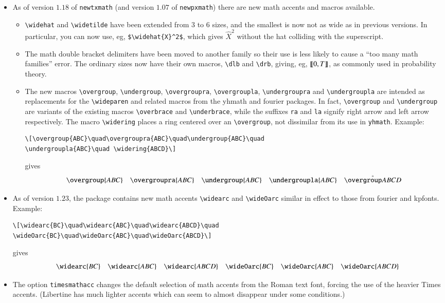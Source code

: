 \documentclass[\fsc]{article}
\theoremstyle{oldplain}
\theoremstyle{plain}
\begin{document}
\begin{itemize}
\item As of version $1.18$ of {\tt newtxmath} (and version $1.07$ of {\tt newpxmath}) there are new math accents and macros available.
\begin{itemize}
\item
\verb|\widehat| and \verb|\widetilde| have been extended from $3$ to $6$ sizes, and the smallest is now not as wide as in previous versions. In particular, you can now use, eg, \verb|$\widehat{X}^2$|, which gives $\widehat{X}^2$ without the hat colliding with the superscript.
\item The math double bracket delimiters have been moved to another family so their use is less likely to cause a ``too many math families'' error. The ordinary sizes now have their own macros, \verb|\dlb| and \verb|\drb|, giving, eg, $\llbracket 0,T\rrbracket$, as commonly used in probability theory.
\item The new macros \verb|\overgroup|, \verb|\undergroup|, \verb|\overgroupra|, \verb|\overgroupla|, \verb|\undergroupra| and \verb|\undergroupla| are intended as replacements for the \verb|\wideparen| and related macros from the \textsf{yhmath} and \textsf{fourier} packages. In fact, \verb|\overgroup| and \verb|\undergroup| are variants of the existing macros \verb|\overbrace| and \verb|\underbrace|, while the suffixes {\tt ra} and {\tt la} signify right arrow and left arrow respectively. The macro \verb|\widering| places a ring centered over an \verb|\overgroup|, not dissimilar from its use in {\tt yhmath}. Example:
\begin{verbatim}
\[\overgroup{ABC}\quad\overgroupra{ABC}\quad\undergroup{ABC}\quad
\undergroupla{ABC}\quad \widering{ABCD}\] 
\end{verbatim}
gives
\[\overgroup{ABC}\quad\overgroupra{ABC}\quad\undergroup{ABC}\quad\undergroupla{ABC}\quad\widering{ABCD}\] 
\end{itemize}
\item As of version $1.23$, the package contains new math accents \verb|\widearc| and \verb|\wideOarc| similar in effect to those from \textsf{fourier} and \textsf{kpfonts}. Example: 
\begin{verbatim}
\[\widearc{BC}\quad\widearc{ABC}\quad\widearc{ABCD}\quad
\wideOarc{BC}\quad\wideOarc{ABC}\quad\wideOarc{ABCD}\]
\end{verbatim}
gives
\[\widearc{BC}\quad\widearc{ABC}\quad\widearc{ABCD}\quad
\wideOarc{BC}\quad\wideOarc{ABC}\quad\wideOarc{ABCD}\]
\item The option {\tt timesmathacc} changes the default selection of math accents from the Roman text font, forcing the use of the heavier Times accents. (Libertine has much lighter accents which can seem to almost disappear under some conditions.) 
\end{itemize}
\bigskip
\end{document}
